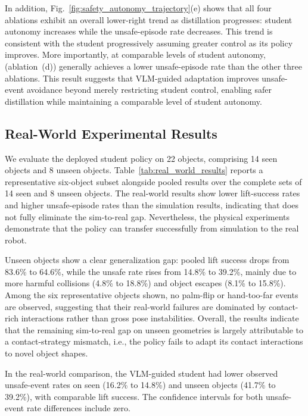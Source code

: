 In addition, Fig.~\ref{fig:safety_autonomy_trajectory}(e) shows that all four
ablations exhibit an overall lower-right trend as distillation progresses:
student autonomy increases while the unsafe-episode rate decreases. This trend
is consistent with the student progressively assuming greater control as its
policy improves. More importantly, at comparable levels of student autonomy,
\methodname (ablation~(d)) generally achieves a lower unsafe-episode rate than
the other three ablations. This result suggests that VLM-guided adaptation
improves unsafe-event avoidance beyond merely restricting student control,
enabling safer distillation while maintaining a comparable level of student
autonomy.

\subsection{Real-World Experimental Results}

We evaluate the deployed student policy on 22 objects, comprising 14 seen objects and 8 unseen objects.
Table~\ref{tab:real_world_results} reports a representative six-object subset
alongside pooled results over the complete sets of 14 seen and 8 unseen objects.
The real-world results show lower lift-success rates and higher unsafe-episode rates than
the simulation results, indicating that \methodname does
not fully eliminate the sim-to-real gap. Nevertheless, the physical experiments demonstrate
that the policy can transfer successfully from simulation to the real robot.

Unseen objects show a clear generalization gap: pooled lift success drops from
83.6\% to 64.6\%, while the unsafe rate rises from 14.8\% to 39.2\%, mainly
due to more harmful collisions (4.8\% to 18.8\%) and object escapes (8.1\% to
15.8\%). Among
the six representative objects shown, no palm-flip or hand-too-far events are
observed, suggesting that their real-world failures are dominated by
contact-rich interactions rather than gross pose instabilities. Overall, the
results indicate that the remaining sim-to-real gap on unseen geometries is
largely attributable to a contact-strategy mismatch, i.e., the policy fails to
adapt its contact interactions to novel object shapes.

In the real-world comparison, the VLM-guided student had lower observed
unsafe-event rates on seen (16.2\% to 14.8\%) and unseen objects (41.7\% to
39.2\%), with comparable lift success. The confidence intervals for both
unsafe-event rate differences include zero.

